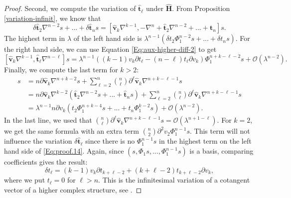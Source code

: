 \documentclass[11pt]{amsart}
\newtheorem{Remark}[thm]{Remark}
\numberwithin{thm}{section} %
\numberwithin{equation}{section} %
\numberwithin{figure}{section} %
\renewcommand*{\l}{\lambda}
\begin{document}
\begin{proof}
Second, we compute the variation of $\bm\hat{t}_\ell$ under $\bm\hat{H}$. From Proposition \ref{variation-infinit}, we know that
\begin{equation}\label{Eq:proof.14}
\delta\bm\hat{t}_2 \nabla^{n-2}s+...+\delta\bm\hat{t}_n s = [\bm\hat{v}_k\nabla^{k-1},-\nabla^n+\bm\hat{t}_2\nabla^{n-2}+...+\bm\hat{t}_n]s.
\end{equation}
The highest term in $\l$ of the left hand side is $\l^{n-1}(\delta t_2\Phi_1^{n-2}s+...+\delta t_n s)$. For the right hand side, we can use Equation \eqref{Eq:aux-higher-diff-2} to get
$$[\bm\hat{v}_k\nabla^{k-1}, \bm\hat{t}_\ell\nabla^{n-\ell}]s = \l^{n-1}((k-1)v_k\partial t_\ell-(n-\ell)t_\ell\partial v_k)\Phi_1^{n+k-\ell-2}s+\mathcal{O}(\l^{n-2}).$$
Finally, we compute the last term for $k> 2$:
\begin{align*}
    [\nabla^n,\bm\hat{v}_k\nabla^{k-1}]s &= n\partial \bm\hat{v}_k\nabla^{n+k-2}s+\sum_{\ell=2}^n \binom{n}{\ell}\partial^\ell\bm\hat{v}_k \nabla^{n+k-\ell-1}s \\
&= n\partial \bm\hat{v}_k\nabla^{k-2}(\bm\hat{t}_2\nabla^{n-2}s+...+\bm\hat{t}_n s)+\sum_{\ell=2}^n \binom{n}{\ell}\partial^\ell\bm\hat{v}_k \nabla^{n+k-\ell-1}s \\
&= \l^{n-1} n\partial v_k(t_2\Phi_1^{n+k-4}s+...+t_n\Phi_1^{k-2}s)+\mathcal{O}(\l^{n-2}).
\end{align*}
In the last line, we used that $\binom{n}{\ell}\partial^\ell\bm\hat{v}_k \nabla^{n+k-\ell-1}s=\mathcal{O}(\l^{n+1-\ell})$. For $k=2$, we get the same formula with an extra term $\binom{n}{2}\partial^2 v_2\Phi_1^{n-1}s$.
This term will not influence the variation $\delta\bm\hat{t}_\ell$ since there is no $\Phi_1^{n-1}s$ in the highest term on the left hand side of \eqref{Eq:proof.14}.
Again, since $(s,\Phi_1s,...,\Phi_1^{n-1}s)$ is a basis, comparing coefficients gives the result:
$$\delta t_\ell = (k-1)v_k\partial t_{k+\ell-2}+(k+\ell-2)t_{k+\ell-2}\partial v_k,$$
where we put $t_\ell=0$ for $\ell>n$. This is the infinitesimal variation of a cotangent vector of a higher complex structure, see \cite[Proposition 7.18]{Fock-bundles}.
\end{proof}

\end{document}
